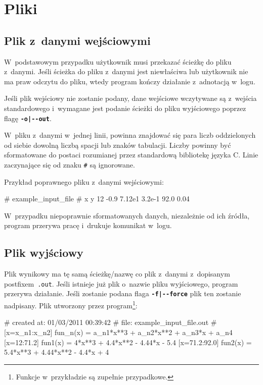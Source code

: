 \documentclass[10pt,a4paper]{article}
\newcommand{\prog}[1]{\texttt{#1}}
\newcommand{\flag}[1]{\textbf{\prog{#1}}}
\begin{document}
\section{Pliki}
\label{sec:pliki}

\subsection{Plik z~danymi wejściowymi}
\label{sec:plik_wejsciowy}

W~podstawowym przypadku użytkownik musi przekazać ścieżkę do pliku z~danymi.
Jeśli ścieżka do pliku z~danymi jest niewłaściwa lub użytkownik nie ma praw
odczytu do pliku, wtedy program kończy działanie z~adnotacją w~logu.

Jeśli plik wejściowy nie zostanie podany, dane wejściowe wczytywane są
z~wejścia standardowego i~wymagane jest podanie ścieżki do pliku wyjściowego
poprzez flagę \flag{-o|-\--out}.

W~pliku z~danymi w~jednej linii, powinna znajdować się para liczb oddzielonych
od siebie dowolną liczbą spacji lub znaków tabulacji. Liczby powinny być
sformatowane do postaci rozumianej przez standardową bibliotekę języka C.
Linie zaczynające się od znaku \prog{\#} są ignorowane.

Przykład poprawnego pliku z~danymi wejściowymi:
\vspace{-12pt}
\begin{SmallVerbatim}
    # example_input_file
    # x y
    12     -0.9
    7.12e1  3.2e-1  
    92.0    0.04
\end{SmallVerbatim}

W~przypadku niepoprawnie sformatowanych danych, niezależnie od ich źródła,
program przerywa pracę i~drukuje komunikat w~logu.

\subsection{Plik wyjściowy}
\label{sec:plik_wyjsciowy}

Plik wynikowy ma tę samą ścieżkę/nazwę co plik z~danymi z~dopisanym
postfixem~\prog{.out}. Jeśli istnieje już plik o~nazwie pliku wyjściowego,
program przerywa działanie. Jeśli zostanie podana flaga \flag{-f|-\--force}
plik ten zostanie nadpisany. Plik utworzony przez program\footnote{Funkcje
w~przykładzie są zupełnie przypadkowe.}:
\vspace{-12pt}
\begin{SmallVerbatim}
    # created at: 01/03/2011 00:39:42
    #       file: example_input_file.out
    # [x=x_{n1}:x_{n2}] fun_n(x) = a_{n1}*x**3 + a_{n2}*x**2 + a_{n3}*x + a_{n4}
    [x=12:71.2] fun1(x) = 4*x**3 + 4.4*x**2 - 4.44*x - 5.4
    [x=71.2:92.0] fun2(x) = 5.4*x**3 + 4.44*x**2 - 4.4*x + 4
\end{SmallVerbatim}
\end{document}

